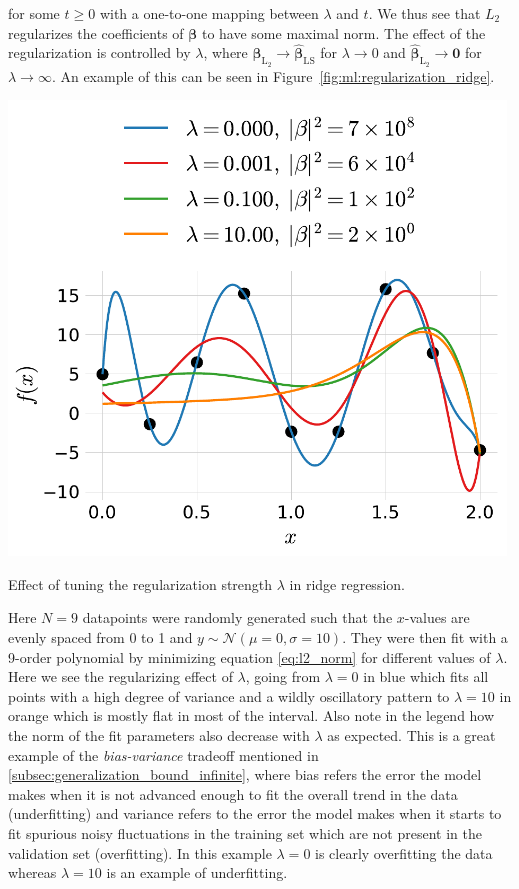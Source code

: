 \documentclass[a4paper, twoside, nobib]{tufte-book}
\renewcommand{\vec}[1]{\mathbf{#1}}
\begin{document}
for some $t \geq 0$ with a one-to-one mapping between $\lambda$ and $t$. We thus see that $L_2$ regularizes the coefficients of $\bm{\beta}$ to have some maximal norm. The effect of the regularization is controlled by $\lambda$, where $\hat{\bm{\beta}}_{\mathrm{L_2}} \rightarrow \hat{\bm{\beta}}_{\mathrm{LS}}$ for $\lambda \rightarrow 0$ and $\hat{\bm{\beta}}_{\mathrm{L_2}} \rightarrow \vec{0}$ for $\lambda \rightarrow \infty$. An example of this can be seen in Figure~\ref{fig:ml:regularization_ridge}. 
\begin{marginfigure}
  \includegraphics[width=0.99\textwidth, trim=5 5 5 5, clip]{figures/ridge_regression/ridge.pdf}
  \caption[Regularization Effect]
    {Effect of tuning the regularization strength $\lambda$ in ridge regression.
    }
  \label{fig:ml:regularization_ridge}
\end{marginfigure}
Here $N=9$ datapoints were randomly generated such that the $x$-values are evenly spaced from \num{0} to \num{1} and $y \sim \mathcal{N}(\mu=0, \sigma=10)$. They were then fit with a \num{9}-order polynomial by minimizing equation \eqref{eq:l2_norm} for different values of $\lambda$. Here we see the regularizing effect of $\lambda$, going from $\lambda=0$ in blue which fits all points with a high degree of variance and a wildly oscillatory pattern to $\lambda=10$ in orange which is mostly flat in most of the interval. Also note in the legend how the norm of the fit parameters also decrease with $\lambda$ as expected. This is a great example of the \emph{bias-variance} tradeoff mentioned in \autoref{subsec:generalization_bound_infinite}, where bias refers the error the model makes when it is not advanced enough to fit the overall trend in the data (underfitting) and variance refers to the error the model makes when it starts to fit spurious noisy fluctuations in the training set which are not present in the validation set (overfitting). In this example $\lambda=0$ is clearly overfitting the data whereas $\lambda=10$ is an example of underfitting. 
\end{document}

